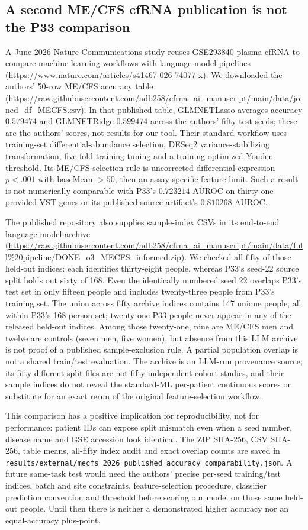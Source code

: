 \documentclass[11pt,a4paper]{article}
\begin{document}
\subsection{A second ME/CFS cfRNA publication is not the P33 comparison}
A June 2026 Nature Communications study reuses GSE293840 plasma cfRNA to compare machine-learning workflows with language-model pipelines (\url{https://www.nature.com/articles/s41467-026-74077-x}). We downloaded the authors' 50-row ME/CFS accuracy table (\url{https://raw.githubusercontent.com/adb258/cfrna_ai_manuscript/main/data/joined_df_MECFS.csv}). In that published table, GLMNETLasso averages accuracy $0.579474$ and GLMNETRidge $0.599474$ across the authors' fifty test seeds; these are the authors' scores, not results for our tool. Their standard workflow uses training-set differential-abundance selection, DESeq2 variance-stabilizing transformation, five-fold training tuning and a training-optimized Youden threshold. Its ME/CFS selection rule is uncorrected differential-expression $p<.001$ with baseMean $>50$, then an assay-specific feature limit. Such a result is not numerically comparable with P33's $0.723214$ AUROC on thirty-one provided VST genes or its published source artifact's $0.810268$ AUROC.

The published repository also supplies sample-index CSVs in its end-to-end language-model archive (\url{https://raw.githubusercontent.com/adb258/cfrna_ai_manuscript/main/data/full%20pipeline/DONE_o3_MECFS_informed.zip}). We checked all fifty of those held-out indices: each identifies thirty-eight people, whereas P33's seed-22 source split holds out sixty of 168. Even the identically numbered seed 22 overlaps P33's test set in only fifteen people and includes twenty-three people from P33's training set. The union across fifty archive indices contains 147 unique people, all within P33's 168-person set; twenty-one P33 people never appear in any of the released held-out indices. Among those twenty-one, nine are ME/CFS men and twelve are controls (seven men, five women), but absence from this LLM archive is not proof of a published sample-exclusion rule. A partial population overlap is not a shared train/test evaluation. The archive is an LLM-run provenance source; its fifty different split files are not fifty independent cohort studies, and their sample indices do not reveal the standard-ML per-patient continuous scores or substitute for an exact rerun of the original feature-selection workflow.

This comparison has a positive implication for reproducibility, not for performance: patient IDs can expose split mismatch even when a seed number, disease name and GSE accession look identical. The ZIP SHA-256, CSV SHA-256, table means, all-fifty index audit and exact overlap counts are saved in \texttt{results/external/mecfs\_2026\_published\_accuracy\_comparability.json}. A future same-task test would need the authors' precise per-seed training/test indices, batch and site constraints, feature-selection procedure, classifier prediction convention and threshold before scoring our model on those same held-out people. Until then there is neither a demonstrated higher accuracy nor an equal-accuracy plus-point.
\end{document}
